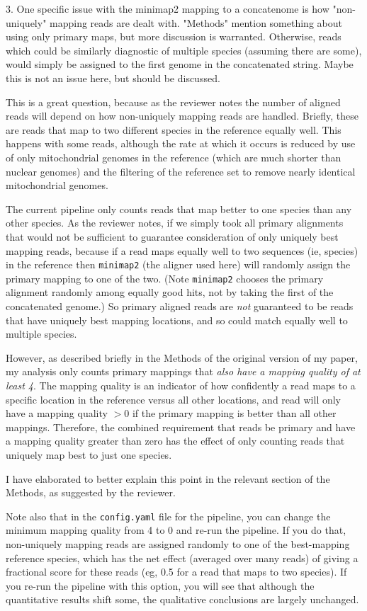 \documentclass[11pt, oneside]{article}   	%
\newcommand{\response}[1]{{\color{black}#1}}
\begin{document}
3. One specific issue with the minimap2 mapping to a concatenome is how "non-uniquely" mapping reads are dealt with. "Methods" mention something about using only primary maps, but more discussion is warranted. Otherwise, reads which could be similarly diagnostic of multiple species (assuming there are some), would simply be assigned to the first genome in the concatenated string. Maybe this is not an issue here, but should be discussed.

\response{
This is a great question, because as the reviewer notes the number of aligned reads will depend on how non-uniquely mapping reads are handled.
Briefly, these are reads that map to two different species in the reference equally well.
This happens with some reads, although the rate at which it occurs is reduced by use of only mitochondrial genomes in the reference (which are much shorter than nuclear genomes) and the filtering of the reference set to remove nearly identical mitochondrial genomes.

The current pipeline only counts reads that map better to one species than any other species.
As the reviewer notes, if we simply took all primary alignments that would not be sufficient to guarantee consideration of only uniquely best mapping reads, because if a read maps equally well to two sequences (ie, species) in the reference then \texttt{minimap2} (the aligner used here) will randomly assign the primary mapping to one of the two.
(Note \texttt{minimap2} chooses the primary alignment randomly among equally good hits, not by taking the first of the concatenated genome.)
So primary aligned reads are \emph{not} guaranteed to be reads that have uniquely best mapping locations, and so could match equally well to multiple species.

However, as described briefly in the Methods of the original version of my paper, my analysis only counts primary mappings that \emph{also have a mapping quality of at least 4}.
The mapping quality is an indicator of how confidently a read maps to a specific location in the reference versus all other locations, and read will only have a mapping quality $>$0 if the primary mapping is better than all other mappings.
Therefore, the combined requirement that reads be primary and have a mapping quality greater than zero has the effect of only counting reads that uniquely map best to just one species.

I have elaborated to better explain this point in the relevant section of the Methods, as suggested by the reviewer.

Note also that in the \texttt{config.yaml} file for the pipeline, you can change the minimum mapping quality from 4 to 0 and re-run the pipeline.
If you do that, non-uniquely mapping reads are assigned randomly to one of the best-mapping reference species, which has the net effect (averaged over many reads) of giving a fractional score for these reads (eg, 0.5 for a read that maps to two species).
If you re-run the pipeline with this option, you will see that although the quantitative results shift some, the qualitative conclusions are largely unchanged.
}
\end{document}
